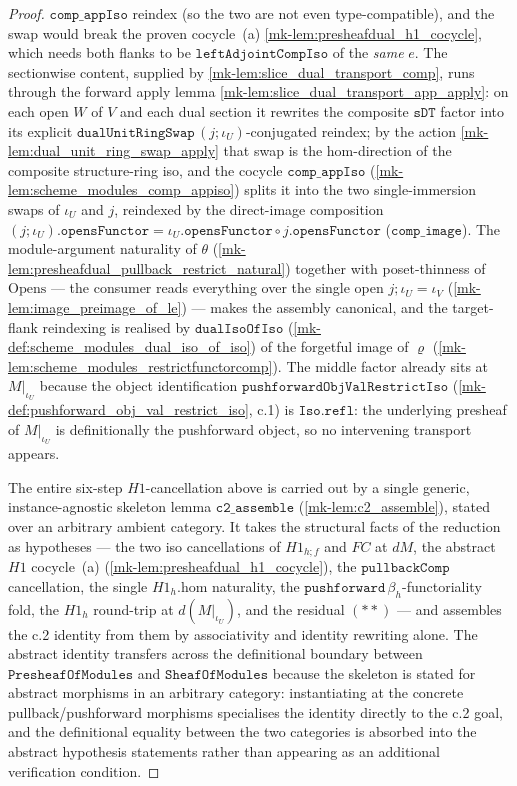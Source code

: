 \begin{proof}
  \(\mathtt{comp\_appIso}\) reindex (so the two are not even type-compatible), and the swap would break
  the proven cocycle~(a) \ref{mk-lem:presheafdual_h1_cocycle}, which needs both flanks to be
  \(\mathtt{leftAdjointCompIso}\) of the \emph{same} \(e\).
  The sectionwise content, supplied by \ref{mk-lem:slice_dual_transport_comp}, runs
  through the forward apply lemma \ref{mk-lem:slice_dual_transport_app_apply}: on each open \(W\) of \(V\)
  and each dual section it rewrites the composite \(\mathtt{sDT}\) factor into its explicit
  \(\mathtt{dualUnitRingSwap}\,(j\mathbin{;}\iota_U)\)-conjugated reindex; by the action
  \ref{mk-lem:dual_unit_ring_swap_apply} that swap is the \(\mathrm{hom}\)-direction of the composite
  structure-ring iso, and the cocycle \(\mathtt{comp\_appIso}\) (\ref{mk-lem:scheme_modules_comp_appiso})
  splits it into the two single-immersion swaps of \(\iota_U\) and \(j\), reindexed by the direct-image
  composition \((j\mathbin{;}\iota_U).\mathtt{opensFunctor} =
  \iota_U.\mathtt{opensFunctor}\circ j.\mathtt{opensFunctor}\) (\(\mathtt{comp\_image}\)). The
  module-argument naturality of \(\theta\)
  (\ref{mk-lem:presheafdual_pullback_restrict_natural}) together with poset-thinness of
  \(\mathrm{Opens}\) --- the consumer reads everything over the single open \(j\mathbin{;}\iota_U=\iota_V\)
  (\ref{mk-lem:image_preimage_of_le}) --- makes the assembly canonical, and the target-flank reindexing is
  realised by \(\mathtt{dualIsoOfIso}\) (\ref{mk-def:scheme_modules_dual_iso_of_iso}) of the forgetful image
  of \(\varrho\) (\ref{mk-lem:scheme_modules_restrictfunctorcomp}). The middle factor already sits at
  \(M|_{\iota_U}\) because the object identification \(\mathtt{pushforwardObjValRestrictIso}\)
  (\ref{mk-def:pushforward_obj_val_restrict_iso}, c.1) is \(\mathtt{Iso.refl}\): the underlying presheaf
  of \(M|_{\iota_U}\) is definitionally the pushforward object, so no intervening transport appears.

  The entire six-step \(H1\)-cancellation above is carried out by a single generic,
  instance-agnostic skeleton lemma \(\mathtt{c2\_assemble}\) (\ref{mk-lem:c2_assemble}), stated over an
  arbitrary ambient category. It takes the structural facts of the reduction as hypotheses --- the two
  iso cancellations of \(H1_{h \mathbin{;} f}\) and \(FC\) at \(dM\), the abstract \(H1\) cocycle~(a)
  (\ref{mk-lem:presheafdual_h1_cocycle}), the \(\mathtt{pullbackComp}\) cancellation, the single
  \(H1_h.\mathrm{hom}\) naturality, the \(\mathtt{pushforward}\,\beta_h\)-functoriality fold, the
  \(H1_h\) round-trip at \(d(M|_{\iota_U})\), and the residual \((**)\) --- and assembles the c.2
  identity from them by associativity and identity rewriting alone. The abstract identity transfers
  across the definitional boundary between \(\mathtt{PresheafOfModules}\) and
  \(\mathtt{SheafOfModules}\) because the skeleton is stated for abstract morphisms in an arbitrary
  category: instantiating at the concrete pullback/pushforward morphisms specialises the identity
  directly to the c.2 goal, and the definitional equality between the two categories is absorbed into
  the abstract hypothesis statements rather than appearing as an additional verification condition.
\end{proof}

